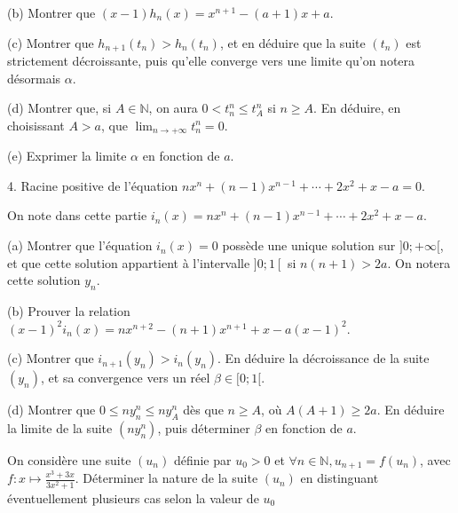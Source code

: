 \documentclass[a4paper, 11pt,reqno]{article}
\begin{document}
\begin{exercice}
(b) Montrer que $(x-1) h_{n}(x)=x^{n+1}-(a+1) x+a$.

(c) Montrer que $h_{n+1}\left(t_{n}\right)>h_{n}\left(t_{n}\right)$, et en déduire que la suite $\left(t_{n}\right)$ est strictement décroissante, puis qu'elle converge vers une limite qu'on notera désormais $\alpha$.

(d) Montrer que, si $A \in \mathbb{N}$, on aura $0<t_{n}^{n} \leq t_{A}^{n}$ si $n \geq A .$ En déduire, en choisissant $A>a$, que $\lim _{n \rightarrow+\infty} t_{n}^{n}=0$.

(e) Exprimer la limite $\alpha$ en fonction de $a$.

4. Racine positive de l'équation $n x^{n}+(n-1) x^{n-1}+\cdots+2 x^{2}+x-a=0$.

On note dans cette partie $i_{n}(x)=n x^{n}+(n-1) x^{n-1}+\cdots+2 x^{2}+x-a$.

(a) Montrer que l'équation $i_{n}(x)=0$ possède une unique solution sur $] 0 ;+\infty[$, et que cette solution appartient à l'intervalle $] 0 ; 1\left[\right.$ si $n(n+1)>2 a$. On notera cette solution $y_{n}$.

(b) Prouver la relation $(x-1)^{2} i_{n}(x)=n x^{n+2}-(n+1) x^{n+1}+x-a(x-1)^{2}$.

(c) Montrer que $i_{n+1}\left(y_{n}\right)>i_{n}\left(y_{n}\right)$. En déduire la décroissance de la suite $\left(y_{n}\right)$, et sa convergence vers un réel $\beta \in[0 ; 1[$.

(d) Montrer que $0 \leq n y_{n}^{n} \leq n y_{A}^{n}$ dès que $n \geq A$, où $A(A+1) \geq 2 a .$ En déduire la limite de la suite $\left(n y_{n}^{n}\right)$, puis déterminer $\beta$ en fonction de $a$.

\end{exercice}

\begin{exercice}
On considère une suite $\left(u_{n}\right)$ définie par $u_{0}>0$ et $\forall n \in \mathbb{N}, u_{n+1}=f\left(u_{n}\right)$, avec $f: x \mapsto \frac{x^{3}+3 x}{3 x^{2}+1} .$ Déterminer la nature de la suite $\left(u_{n}\right)$ en distinguant éventuellement plusieurs cas selon la valeur de $u_{0}$
\end{exercice}
\end{document}
